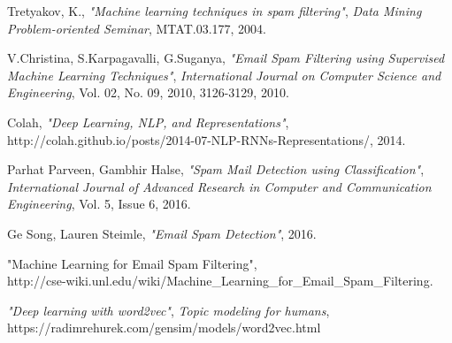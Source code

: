 \begin{thebibliography}{9}
Tretyakov, K., \textit{"Machine learning techniques in spam filtering"}, \textit{Data Mining Problem-oriented Seminar}, MTAT.03.177, 2004.
 
V.Christina, S.Karpagavalli, G.Suganya, \textit{"Email Spam Filtering using Supervised Machine Learning Techniques"}, \textit{ International Journal on Computer Science and Engineering}, Vol. 02, No. 09, 2010, 3126-3129, 2010.
 
Colah, \textit{"Deep Learning, NLP, and Representations"}, http://colah.github.io/posts/2014-07-NLP-RNNs-Representations/, 2014.
 
Parhat Parveen, Gambhir Halse, \textit{"Spam Mail Detection using Classification"}, \textit{International Journal of Advanced Research in Computer and Communication Engineering}, Vol. 5, Issue 6, 2016.

Ge Song, Lauren Steimle, \textit{"Email Spam Detection"}, 2016.

{"Machine Learning for Email Spam Filtering"},\\ http://cse-wiki.unl.edu/wiki/Machine\_Learning\_for\_Email\_Spam\_Filtering.

\textit{"Deep learning with word2vec"}, \textit{Topic modeling for humans},\\https://radimrehurek.com/gensim/models/word2vec.html
\end{thebibliography}